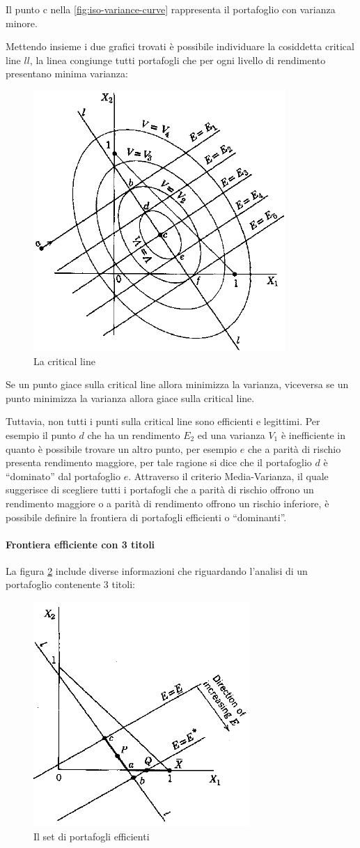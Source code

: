 \newpage
Il punto c nella \ref{fig:iso-variance-curve} rappresenta il portafoglio con varianza minore.

Mettendo insieme i due grafici trovati è possibile individuare la cosiddetta critical line $ll$, la linea congiunge tutti portafogli che per ogni livello di rendimento presentano minima varianza:

\begin{figure}[h!]
	\centering
	\includegraphics[width=0.4\linewidth]{"imgs/critical line"}
	\caption{La critical line}
	\label{fig:critical-line}
\end{figure}

Se un punto giace sulla critical line allora minimizza la varianza, viceversa se un punto minimizza la varianza allora giace sulla critical line. 

Tuttavia, non tutti i punti sulla critical line sono efficienti e legittimi. Per esempio il punto $d$ che ha un rendimento $E_2$ ed una varianza $V_1$ è inefficiente in quanto è possibile trovare un altro punto, per esempio $e$ che a parità di rischio presenta rendimento maggiore, per tale ragione si dice che il portafoglio $d$ è “dominato” dal portafoglio $e$.  Attraverso il criterio Media-Varianza, il quale suggerisce di scegliere tutti i portafogli che a parità di rischio offrono un rendimento maggiore o a parità di rendimento offrono un rischio inferiore, è possibile definire la frontiera di portafogli efficienti o “dominanti”.

\newpage
\paragraph{Frontiera efficiente con 3 titoli} 

La figura \ref{fig:the-set-of-efficient-portfolios} include diverse informazioni che riguardando l'analisi di un portafoglio contenente 3 titoli: 
\begin{figure} [h!]
	\centering
	\includegraphics[width=0.4\linewidth]{"imgs/The set of efficient portfolios"}
	\caption{Il set di portafogli efficienti}
	\label{fig:the-set-of-efficient-portfolios}
\end{figure}



